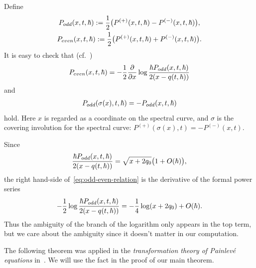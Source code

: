 \documentclass[11pt]{article}
\theoremstyle{definition}
\numberwithin{equation}{section}
\def\p{\partial}
\begin{document}
Def\/ine
\begin{gather*}
P_{\rm odd}(x,t,\hbar)   :=   \frac{1}{2}
\big( P^{(+)}(x,t,\hbar) - P^{(-)}(x,t,\hbar) \big), \\
P_{\rm even}(x,t,\hbar)   :=   \frac{1}{2}
\big( P^{(+)}(x,t,\hbar) + P^{(-)}(x,t,\hbar) \big).
\end{gather*}
It is easy to check that (cf.~\cite[Section~2]{KT05})
\begin{gather} \label{eq:odd-even-relation}
P_{\rm even}(x,t,\hbar) =
-\frac{1}{2}\frac{\p}{\p x}
\log \frac{ \hbar P_{\rm odd}(x,t,\hbar)}
{2(x-q(t,\hbar))}
\end{gather}
and
\begin{gather} \label{eq:parity}
P_{\rm odd}(\sigma(x),t,\hbar) = - P_{\rm odd}(x,t,\hbar)
\end{gather}
hold. Here $x$ is regarded as a coordinate on the spectral curve,
and $\sigma$ is the covering involution for the spectral curve:
$P^{(+)}(\sigma(x),t) = - P^{(-)}(x,t)$.

Since
\begin{gather*}
\frac{ \hbar P_{\rm odd}(x,t,\hbar)}{2(x-q(t,\hbar))} =
\sqrt{x+2q_{0}} \big( 1 + O(\hbar) \big),
\end{gather*}
the right hand-side of~\eqref{eq:odd-even-relation}
is the derivative of the formal power series
\begin{gather*}
-\frac{1}{2}\log\frac{ \hbar P_{\rm odd}(x,t,\hbar)}{2(x-q(t,\hbar))} =
-\frac{1}{4}\log(x+2q_{0}) + O(\hbar).
\end{gather*}
Thus the ambiguity of the branch of the logarithm
only appears in the top term, but
we care about the ambiguity since
it doesn't matter in our computation.


The following theorem was applied in the
{\it transformation theory of Painlev\'e equations}
in~\cite{KT-PI}. We will use the fact
in the proof of our main theorem.
\end{document}
